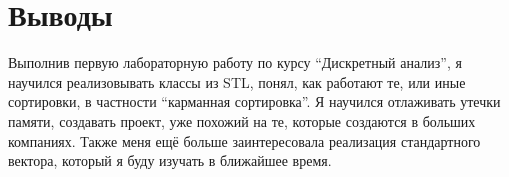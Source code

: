\section{Выводы}
Выполнив первую лабораторную работу по курсу \enquote{Дискретный анализ}, я научился реализовывать классы из STL, понял, как работают те, или иные сортировки, в частности \enquote{карманная сортировка}.
Я научился отлаживать утечки памяти, создавать проект, уже похожий на те, которые создаются в больших компаниях.
Также меня ещё больше заинтересовала реализация стандартного вектора, который я буду изучать в ближайшее время.
\pagebreak
